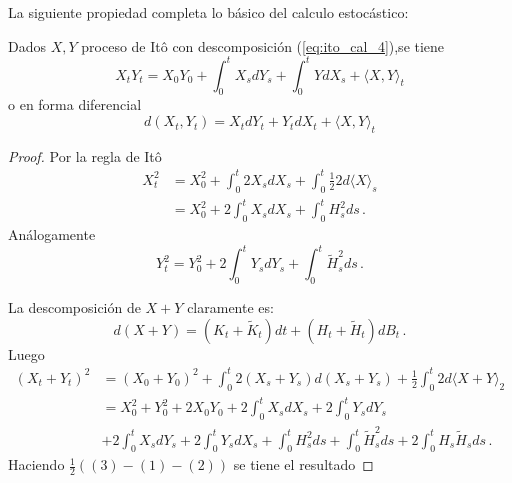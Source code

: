 La siguiente propiedad completa lo básico del calculo estocástico:
\begin{proposition}
Dados $X,Y$ proceso de It\^{o} con descomposición (\ref{eq:ito_cal_4}),se tiene 
\begin{equation*}
    X_t Y_t = X_0 Y_0 + \int_{0}^{t} X_s dY_s + \int_{0}^{t} Y dX_s + \langle X,Y \rangle_t
\end{equation*}
o en forma diferencial 
\begin{equation*}
    d(X_t, Y_t) = X_t dY_t + Y_t dX_t + \langle X,Y \rangle_t
\end{equation*}
\end{proposition}
\begin{proof}
\gris
Por la regla de It\^{o} 
\begin{align*}
    \label{eq:ito_cal_5_1}
    \tag{1}
    X^2_{t} &= X^2_{0} + \int_{0}^{t} 2 X_s dX_s + \int_{0}^{t} \frac{1}{2} 2 d \langle X \rangle_s\\
            &= X^2_{0} + 2 \int_{0}^{t} X_s d X_s + \int_{0}^{t} H_s^2 ds \,.
\end{align*}
Análogamente
\begin{equation*}
    \label{eq:ito_cal_5_2}
    \tag{2}
    Y^2_{t} = Y^2_{0} + 2 \int_{0}^{t} Y_s d Y_s + \int_{0}^{t} \tilde{H}_s^2 ds \,.
\end{equation*}

La descomposición de $X + Y$ claramente es: 
\begin{equation*}
        d(X +Y) = (K_t + \tilde{K}_t) dt + (H_t + \tilde{H}_t) dB_t \,.
\end{equation*}
Luego 
\begin{align*}
    (X_t + Y_t)^2 & = (X_0 + Y_0)^2 + \int_{0}^{t} 2 (X_s + Y_s) d(X_s + Y_s) + \frac{1}{2} \int_{0}^{t} 2d \langle X + Y \rangle_2 \\
    &=X_0^2 + Y_0^2 + 2X_0Y_0 + 2 \int_{0}^{t} X_s dX_s + 2 \int_{0}^{t} Y_s dY_s  \\
    &+ 2 \int_{0}^{t} X_s dY_s + 2 \int_{0}^{t} Y_s dX_s + \int_{0}^{t} H_s^2 ds + \int_{0}^{t} \tilde{H}_s^2 ds + 2 \int_{0}^{t} H_s \tilde{H}_s ds \,.
\end{align*}
Haciendo $\frac{1}{2} ( (3) - (1) - (2) )$ se tiene el resultado \findem
\negro
\end{proof}

\newpage
